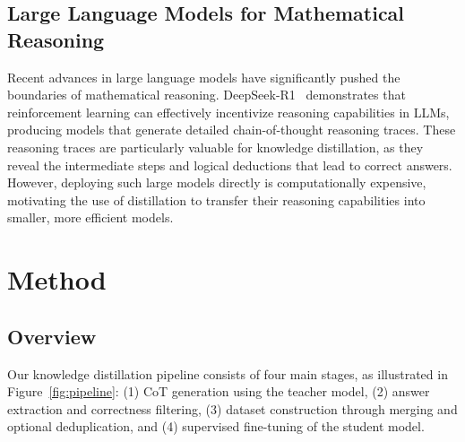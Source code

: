 \documentclass{article}
\begin{document}
\subsection{Large Language Models for Mathematical Reasoning}

Recent advances in large language models have significantly pushed the boundaries of mathematical reasoning. DeepSeek-R1~\cite{deepseek2025r1} demonstrates that reinforcement learning can effectively incentivize reasoning capabilities in LLMs, producing models that generate detailed chain-of-thought reasoning traces. These reasoning traces are particularly valuable for knowledge distillation, as they reveal the intermediate steps and logical deductions that lead to correct answers. However, deploying such large models directly is computationally expensive, motivating the use of distillation to transfer their reasoning capabilities into smaller, more efficient models.

\section{Method}

\subsection{Overview}

Our knowledge distillation pipeline consists of four main stages, as illustrated in Figure~\ref{fig:pipeline}: (1) CoT generation using the teacher model, (2) answer extraction and correctness filtering, (3) dataset construction through merging and optional deduplication, and (4) supervised fine-tuning of the student model.
\end{document}
